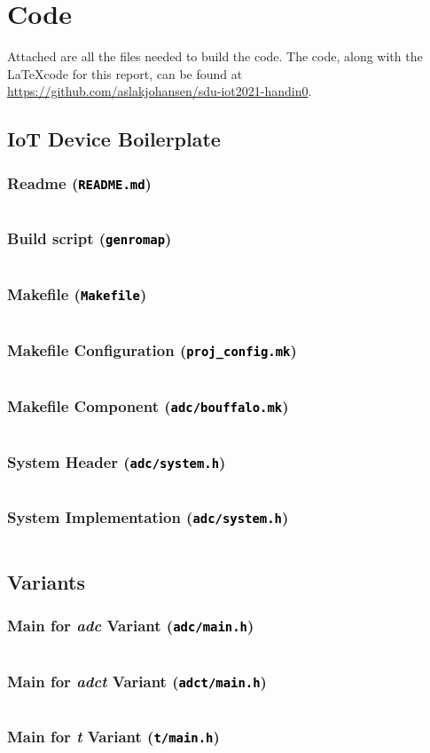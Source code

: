 \documentclass[a4paper]{article}
\newcommand{\textdesc}[1]{\textit{\textbf{#1}}}
\newcommand{\filename}[1]{\texttt{\textcolor{black}{#1}}}
\newcommand{\includeCode}[5]{
  \subsubsection{#5}
  \label{src:#4}
  {
    \def\_{_}
    \inputminted[fontsize=#1,breaklines]{#2}{{#3}}
  }
}
\begin{document}
\appendix

\section{Code}

Attached are all the files needed to build the code. The code, along with the \LaTeX code for this report, can be found at \url{https://github.com/aslakjohansen/sdu-iot2021-handin0}.

\subsection{IoT Device Boilerplate}

\includeCode{\tiny}{text}{../src/adc/README.md}{adc/README.md}{Readme (\filename{README.md})}
\includeCode{\tiny}{shell}{../src/adc/genromap}{adc/genromap}{Build script (\filename{genromap})}
\includeCode{\tiny}{makefile}{../src/adc/Makefile}{adc/Makefile}{Makefile (\filename{Makefile})}
\includeCode{\tiny}{makefile}{../src/adc/proj\_config.mk}{adc/projconfig.mk}{Makefile Configuration (\filename{proj\_config.mk})}
\includeCode{\tiny}{makefile}{../src/adc/adc/bouffalo.mk}{adc/adc/bouffalo.mk}{Makefile Component (\filename{adc/bouffalo.mk})}
\includeCode{\tiny}{c}{../src/adc/adc/system.h}{adc/adc/system.h}{System Header (\filename{adc/system.h})}
\includeCode{\tiny}{c}{../src/adc/adc/system.c}{adc/adc/system.c}{System Implementation (\filename{adc/system.h})}

\subsection{Variants}

\includeCode{\tiny}{c}{../src/adc/adc/main.c}{adc/adc/main.c}{Main for \textdesc{adc} Variant (\filename{adc/main.h})}
\includeCode{\tiny}{c}{../src/adct/adct/main.c}{adct/adct/main.c}{Main for \textdesc{adct} Variant (\filename{adct/main.h})}
\includeCode{\tiny}{c}{../src/t/t/main.c}{t/t/main.c}{Main for \textdesc{t} Variant (\filename{t/main.h})}
\end{document}
